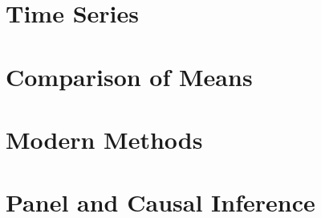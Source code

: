 \documentclass[11pt,twoside,openany]{book}
\begin{document}
\part{Time Series}


\part{Comparison of Means}


\part{Modern Methods}




\part{Panel and Causal Inference}



\end{document}
